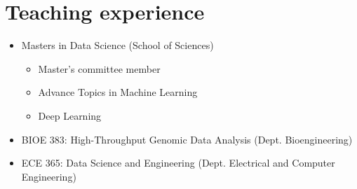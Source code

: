 \documentclass[11pt,a4paper,sans]{moderncv}        %
\begin{document}




%

\section{Teaching experience}
\begin{itemize}
\item Masters in Data Science  (School of Sciences)
\begin{itemize}
\item Master's committee member
\item Advance Topics in Machine Learning
\item Deep Learning
\end{itemize}
\end{itemize}
\vspace{10pt}

\begin{itemize}
\item BIOE 383: High-Throughput Genomic Data Analysis (Dept. Bioengineering)
\item ECE 365: Data Science and Engineering (Dept. Electrical and Computer Engineering)
\end{itemize}
\vspace{10pt}
\end{document}
